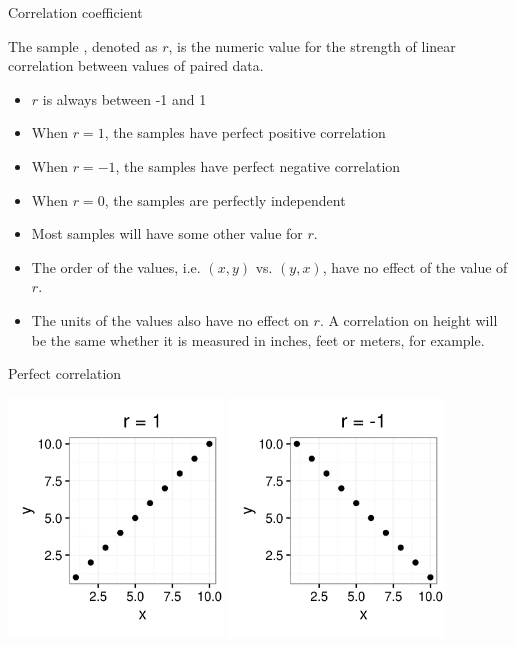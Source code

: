 \documentclass[xcolor=table, handout]{beamer}
\begin{document}
\begin{frame}{Correlation coefficient}
\begin{block}{}
\large
The sample , denoted as $r$, is the numeric value for the strength of linear correlation between values of paired data.
\begin{itemize}
\pause\item $r$ is always between -1 and 1
\pause\item When $r=1$, the samples have perfect positive correlation
\pause\item When $r=-1$, the samples have perfect negative correlation
\pause\item When $r=0$, the samples are perfectly independent
\pause\item Most samples will have some other value for $r$. 
\pause\item The order of the values, i.e. $(x,y)$ vs. $(y,x)$, have no effect of the value of $r$.
\pause\item The units of the values also have no effect on $r$. A correlation on height will be the same whether it is measured in inches, feet or meters, for example.
\end{itemize}
\end{block}


\end{frame}

\begin{frame}{Perfect correlation}

{\centering
\includegraphics[width=2.25in]{../images/ch10_cor_pos1}
\includegraphics[width=2.25in]{../images/ch10_cor_neg1}
\par}
\end{frame}
\end{document}
